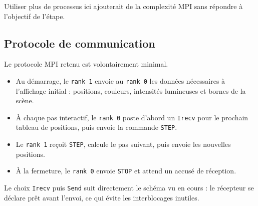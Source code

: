 Utiliser plus de processus ici ajouterait de la complexité MPI sans répondre à l'objectif de l'étape.

\subsection{Protocole de communication}

Le protocole MPI retenu est volontairement minimal.

\begin{itemize}
    \item Au démarrage, le \texttt{rank 1} envoie au \texttt{rank 0} les données nécessaires à l'affichage initial : positions, couleurs, intensités lumineuses et bornes de la scène.
    \item À chaque pas interactif, le \texttt{rank 0} poste d'abord un \texttt{Irecv} pour le prochain tableau de positions, puis envoie la commande \texttt{STEP}.
    \item Le \texttt{rank 1} reçoit \texttt{STEP}, calcule le pas suivant, puis envoie les nouvelles positions.
    \item À la fermeture, le \texttt{rank 0} envoie \texttt{STOP} et attend un accusé de réception.
\end{itemize}

Le choix \texttt{Irecv} puis \texttt{Send} suit directement le schéma vu en cours : le récepteur se déclare prêt avant l'envoi, ce qui évite les interblocages inutiles.